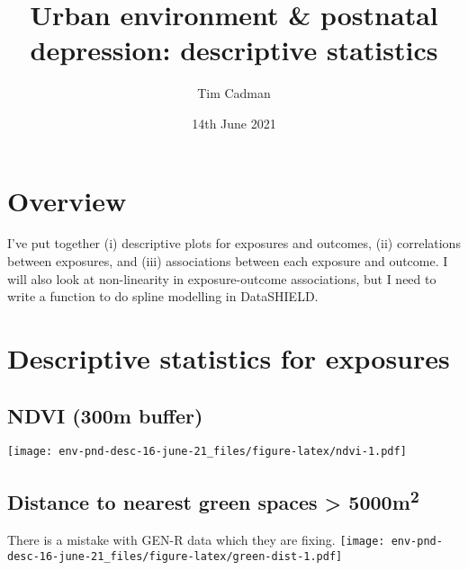 \documentclass[]{article}
\title{Urban environment \& postnatal depression: descriptive statistics}
\author{Tim Cadman}
\date{14th June 2021}
\makeatletter
\newcommand{\fontd}{\fontsize{13}{16}\selectfont}
\renewcommand\tableofcontents{%
    \@starttoc{toc}%
}
\makeatother
\begin{document}
\maketitle

{


\setcounter{tocdepth}{1}

\tableofcontents
}

\raggedright
\fontd
\newpage

\hypertarget{overview}{%
\section{Overview}\label{overview}}

I've put together (i) descriptive plots for exposures and outcomes, (ii)
correlations between exposures, and (iii) associations between each exposure
and outcome. I will also look at non-linearity in exposure-outcome associations,
but I need to write a function to do spline modelling in DataSHIELD.

\newpage

\hypertarget{descriptive-statistics-for-exposures}{%
\section{Descriptive statistics for exposures}\label{descriptive-statistics-for-exposures}}

\hypertarget{ndvi-300m-buffer}{%
\subsection{NDVI (300m buffer)}\label{ndvi-300m-buffer}}

\texttt{[image: env-pnd-desc-16-june-21\_files/figure-latex/ndvi-1.pdf]}

\newpage

\hypertarget{distance-to-nearest-green-spaces-5000m2}{%
\subsection{\texorpdfstring{Distance to nearest green spaces \textgreater{} 5000m\textsuperscript{2}}{Distance to nearest green spaces \textgreater{} 5000m2}}\label{distance-to-nearest-green-spaces-5000m2}}

There is a mistake with GEN-R data which they are fixing.
\texttt{[image: env-pnd-desc-16-june-21\_files/figure-latex/green-dist-1.pdf]}
\end{document}
